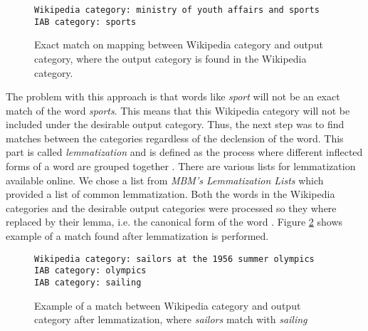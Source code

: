 \begin{figure}[h]
\centering
\begin{lstlisting}
Wikipedia category: ministry of youth affairs and sports
IAB category: sports
\end{lstlisting}
\caption[Exact match on mapping between Wikipedia category and output category]{Exact match on mapping between Wikipedia category and output category, where the output category is found in the Wikipedia category.}
\label{fig:catmapping_exactmatch}
\end{figure}
The problem with this approach is that words like \emph{sport} will not be an exact match of the word \emph{sports}. This means that this Wikipedia category will not be included under the desirable output category. Thus, the next step was to find matches between the categories regardless of the declension of the word. This part is called \emph{lemmatization} and is defined as the process where different inflected forms of a word are grouped together \cite{wiki:lemmatisation}\cite[p.~30-33]{iirbook}. There are various lists for lemmatization available online. We chose a list from \emph{MBM's Lemmatization Lists} \cite{lemmatizationlist} which provided a list of common lemmatization. Both the words in the Wikipedia categories and the desirable output categories were processed so they where replaced by their lemma, i.e. the canonical form of the word \cite{wiki:lemma}. 
Figure \ref{fig:catmapping_lemmamatch} shows example of a match found after lemmatization is performed. 

\begin{figure}[h]
\centering
\begin{lstlisting}
Wikipedia category: sailors at the 1956 summer olympics
IAB category: olympics
IAB category: sailing
\end{lstlisting}
\caption[Example of match after lemmatization]{Example of a match between Wikipedia category and output category after lemmatization, where \emph{sailors} match with \emph{sailing}}
\label{fig:catmapping_lemmamatch}
\end{figure}

\begin{comment}
\subsubsection{Categories not relevant for classification}
Not all categories are suitable for classification, some categories are still just relevant for maintaining a well-structured encyclopedia. Example of such categories are \emph{container categories}, which are categories only containing subcategories. All container categories where found by looking at the file asdfasdf  . Some of these categories have already been removed because they are also hidden categories, but a total of 69 023 categories could be disregarded for this purpose. 
\end{comment}

